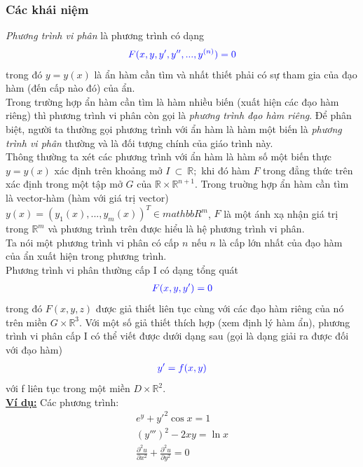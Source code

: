 \documentclass[13pt,a4paper]{article}
\begin{document}
			\subsubsection{Các khái niệm}
				\textit{Phương trình vi phân} là phương trình có dạng
				\begin{align*}
					\color{blue}
						F(x, y, y', y'',..., y^{(n)}) = 0
					\color{blue}
				\end{align*}
				trong đó $y = y(x)$ là ẩn hàm cần tìm và nhất thiết phải có sự tham gia của đạo hàm (đến cấp nào đó) của ẩn. \\
				Trong trường hợp ẩn hàm cần tìm là hàm nhiều biến (xuất hiện các đạo hàm riêng) thì phương trình vi phân còn gọi là \textit{phương trình đạo hàm riêng}. Để phân biệt, người ta thường gọi phương trình với ẩn hàm là hàm một biến là \textit{phương trình vi phân} thường và là đối tượng chính của giáo trình này. \\
				Thông thường ta xét các phương trình với ẩn hàm là hàm số một biến thực $y = y(x)$ xác định trên khoảng mở $I\ \subset\ \mathbb{R};$ khi đó hàm $F$ trong đẳng thức trên xác định trong một tập mở $G$ của $\mathbb{R} \times \mathbb{R}^{n+1}$. Trong truờng hợp ẩn hàm cần tìm là vector-hàm (hàm với giá trị vector) $y(x) = (y_1(x),...,y_m(x))^T \in mathbb{R}^m$, $F$ là một ánh xạ nhận giá trị trong $\mathbb{R}^m$ và phương trình trên được hiểu là hệ phương trình vi phân.\\
				Ta nói một phương trình vi phân có cấp $n$ nếu $n$ là cấp lớn nhất của đạo hàm của ẩn xuất hiện trong phương trình.\\
				Phương trình vi phân thường cấp I có dạng tổng quát
				\begin{align*}
					\color{blue}
						F(x, y, y') = 0
					\color{blue}
				\end{align*}
				trong đó $F(x, y, z)$ được giả thiết liên tục cùng với các đạo hàm riêng của nó trên miền $G \times \mathbb{R}^3$. Với một số giả thiết thích hợp (xem định lý hàm ẩn), phương trình vi phân cấp I có thể viết được dưới dạng sau (gọi là dạng giải ra được đối với đạo hàm)
				\begin{align*}
					\color{blue}
						y' = f(x,y)
					\color{blue}
				\end{align*}
				với f liên tục trong một miền $D \times \mathbb{R}^2$.\\
				\textbf{\underline{Ví dụ:}} Các phương trình:
				\begin{align*}
					e^y + {y'}^2 \cos x = 1 \\
					(y''')^2 - 2xy = \ln x \\
					\frac{\partial^2 u}{\partial x^2} + \frac{\partial^2 u}{\partial y^2} = 0 
				\end{align*}
\end{document}

